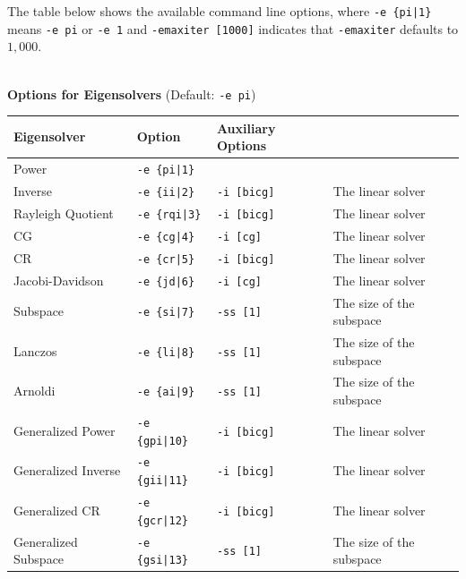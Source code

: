 \documentclass[a4paper]{article}
\begin{document}
The table below shows the available command line options, 
where \verb=-e {pi|1}= means \verb=-e pi= or \verb=-e 1= and \verb=-emaxiter [1000]= indicates 
that \verb=-emaxiter= defaults to $1,000$.
\\
\\
\begin{minipage}[t]{\textwidth}
\begin{center}
{\bf Options for Eigensolvers} (Default: \verb=-e pi=) \\
\begin{tabular}{l|lll}\hline\hline
 Eigensolver      & Option              &  Auxiliary Options  & \\ \hline
\hline
 Power                             & \verb=-e {pi|1}=        &    \\ 
 Inverse                           & \verb=-e {ii|2}=        & 
 \verb=-i [bicg]= & The linear solver \\
 Rayleigh Quotient                 & \verb=-e {rqi|3}=       &
 \verb=-i [bicg]= & The linear solver \\
 CG                                & \verb=-e {cg|4}=        &
 \verb=-i [cg]= & The linear solver \\ 
 CR                                & \verb=-e {cr|5}=        &
 \verb=-i [bicg]= & The linear solver \\ 
 Jacobi-Davidson                   & \verb=-e {jd|6}=        &
 \verb=-i [cg]= & The linear solver \\ 
 Subspace                          & \verb=-e {si|7}=        &
 \verb=-ss [1]= & The size of the subspace \\
 Lanczos                           & \verb=-e {li|8}=        &
 \verb=-ss [1]= & The size of the subspace \\
 Arnoldi                           & \verb=-e {ai|9}=        &
 \verb=-ss [1]= & The size of the subspace \\
 Generalized Power                 & \verb=-e {gpi|10}=      &
 \verb=-i [bicg]= & The linear solver \\ 
 Generalized Inverse               & \verb=-e {gii|11}=      & 
 \verb=-i [bicg]= & The linear solver \\
 Generalized CR                    & \verb=-e {gcr|12}=      & 
 \verb=-i [bicg]= & The linear solver \\
 Generalized Subspace              & \verb=-e {gsi|13}=      &
 \verb=-ss [1]= & The size of the subspace \\
\hline         
\end{tabular}
\end{center}
\end{minipage}
\end{document}
